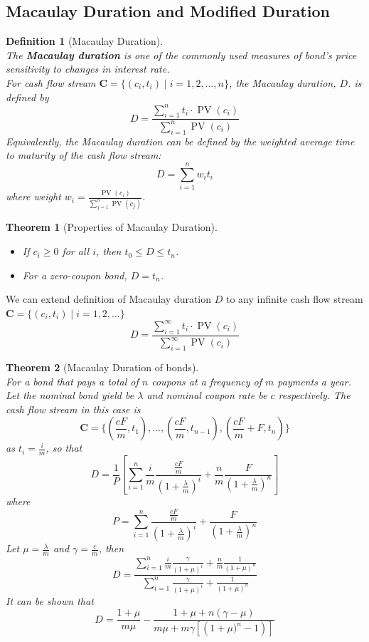 \documentclass[12pt]{article}
\newtheorem{definition}{Definition}[section]
\newtheorem{theorem}{Theorem}[section]
\theoremstyle{definition}
\DeclareMathOperator{\PV}{PV}
\newcommand\cf[1]{\mathbf{#1}}
\begin{document}
\subsection{Macaulay Duration and Modified Duration}
\begin{definition}[Macaulay Duration]
\hfill\\\normalfont The \textbf{Macaulay duration} is one of the commonly used measures of bond's price sensitivity to changes in interest rate.\\
For cash flow stream $\cf{C}=\{(c_i,t_i)\mid i = 1, 2, \ldots, n\}$, the Macaulay duration, $D$. is defined by
\[
D=\frac{\sum_{i=1}^nt_i\cdot\PV(c_i)}{\sum_{i=1}^n\PV(c_i)}
\]
Equivalently, the Macaulay duration can be defined by the weighted average time to maturity of the cash flow stream:
\[
D=\sum_{i=1}^nw_it_i
\]
where weight $w_i = \frac{\PV(c_i)}{\sum_{j=1}^n\PV(c_j)}$.
\end{definition}
\begin{theorem}[Properties of Macaulay Duration]\hfill\\\normalfont
\begin{itemize}
  \item If $c_i\geq 0$ for all $i$, then $t_0\leq D\leq t_n$.
  \item For a zero-coupon bond, $D=t_n$.
\end{itemize}
\end{theorem}
We can extend definition of Macaulay duration $D$ to any infinite cash flow stream $\cf{C}=\{(c_i,t_i)\mid i = 1, 2,\ldots\}$
\[
D=\frac{\sum_{i=1}^\infty t_i\cdot\PV(c_i)}{\sum_{i=1}^\infty\PV(c_i)}
\] 
\begin{theorem}[Macaulay Duration of bonds]\hfill\\\normalfont
For a bond that pays a total of $n$ coupons at a frequency of $m$ payments a year. Let the nominal bond yield be $\lambda$ and nominal coupon rate be $c$ respectively. The cash flow stream in this case is
\[
\cf{C}=\{(\frac{cF}{m}, t_1),\ldots, (\frac{cF}{m},t_{n-1}),(\frac{cF}{m}+F,t_n)\}
\]
as $t_i = \frac{i}{m}$, so that
\[
D=\frac{1}{P}\left[\sum_{i=1}^n\frac{i}{m}\frac{\frac{cF}{m}}{\left(1+\frac{\lambda}{m}\right)^i}+\frac{n}{m}\frac{F}{\left(1+\frac{\lambda}{m}\right)^n}\right]
\]
where
\[
P=\sum_{i=1}^n\frac{\frac{cF}{m}}{\left(1+\frac{\lambda}{m}\right)^i}+\frac{F}{\left(1+\frac{\lambda}{m}\right)^n}
\]
Let $\mu = \frac{\lambda}{m}$ and $\gamma = \frac{c}{m}$, then
\[
D = \frac{\sum_{i=1}^n\frac{i}{m}\frac{\gamma}{(1+\mu)^i}+\frac{n}{m}\frac{1}{(1+\mu)^n}}{\sum_{i=1}^n\frac{\gamma}{(1+\mu)^i}+\frac{1}{(1+\mu)^n}}
\]
It can be shown that
\[
D = \frac{1+\mu}{m\mu}-\frac{1+\mu+n(\gamma-\mu)}{m\mu+m\gamma\left[\left(1+\mu)^n-1\right)\right]}
\]
\end{theorem}
\end{document}
